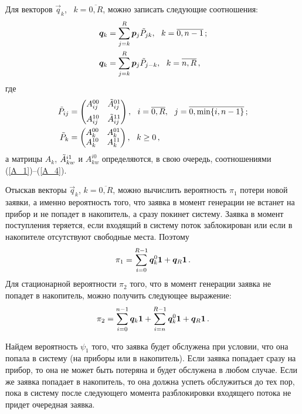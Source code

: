 \begin{multicols}{2}
Для векторов $\vec{q}_k$, \ $k=\overline{0,R}$, можно записать следующие соотношения:
\begin{align}
\label{q_1}
\vec{q}_k &=\sum\limits_{j=k}^{R} \vec{p}_j \Tilde P_{jk},\ \ k=\overline{0,n-1}\,;
\\
\label{q_2}
\vec{q}_k &= \sum\limits_{j=k}^{R} \vec{p}_j \Tilde P_{j-k},\ \ k=\overline{n,R}\,,
\end{align}
где
\begin{align*}
\Tilde P_{ij} &=
\begin{pmatrix}
A_{ij}^{00} & \Tilde A_{ij}^{01} \\[6pt]
A_{ij}^{10} & \Tilde A_{ij}^{11} \\
\end{pmatrix},
\ \ i=\overline{0,R},\ \ j=\overline{0,\min\{i,n-1\}}\,;
\\
\Tilde P_k &=
\begin{pmatrix}
A_k^{00} & A_k^{01} \\
A_k^{10} & A_k^{11} \\
\end{pmatrix},
\ \ k\ge 0\,,
\end{align*}
а матрицы $A_k$, $\Tilde A^{i1}_{kw}$  и $A^{i0}_{kw}$ определяются, в свою очередь,
соотношениями (\ref{A_1})--(\ref{A_4}).

Отыскав векторы $\vec{q}_k$, $k=\overline{0,R}$, можно вычислить вероятность $\pi_1$
потери новой заявки, а именно вероятность того, что заявка в момент генерации
не встанет на прибор и не попадет в накопитель, а сразу покинет систему.
Заявка в момент поступления теряется, если входящий в систему поток заблокирован или
если в накопителе отсутствуют свободные места. Поэтому
\begin{equation}
\label{pi_1}
\pi_1 = \sum\limits_{i=0}^{R-1}\vec{q}^0_k {\bf 1}+ \vec{q}_R {\bf 1}\,.
\end{equation}
Для стационарной вероятности $\pi_2$ того, что в момент генерации заявка не попадет в накопитель,
можно получить следующее выражение:
\begin{equation}
\label{pi_2}
\pi_2 =\sum\limits_{i=0}^{n-1}\vec{q}_k {\bf 1}+\sum\limits_{i=n}^{R-1}\vec{q}^0_k {\bf 1}+\vec{q}_R {\bf 1}\,.
\end{equation}

Найдем вероятность $\psi_1$ того, что заявка будет обслужена при условии,
что она попала в систему (на приборы или в накопитель).
Если заявка попадает сразу на прибор, то она не может быть потеряна и будет обслужена в любом случае.
Если же заявка попадает в накопитель, то она должна успеть обслужиться до тех пор, пока в
систему после следующего момента разблокировки входящего потока не придет очередная заявка.


\end{multicols}
